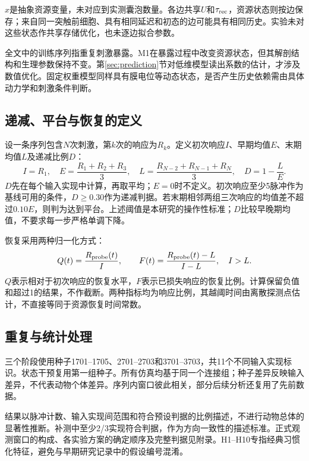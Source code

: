 $x$是抽象资源变量，未对应到实测囊泡数量。各边共享$U$和$\tau_{\rm rec}$，资源状态则按边保存；来自同一突触前细胞、具有相同延迟和初态的边可能具有相同历史。实验未对这些状态作共享存储优化，也未逐边拟合参数。

全文中的训练序列指重复刺激暴露。M1在暴露过程中改变资源状态，但其解剖结构和生理参数保持不变。第\ref{sec:prediction}节对低维模型读出系数的估计，才涉及数值优化。固定权重模型同样具有膜电位等动态状态，是否产生历史依赖需由具体动力学和刺激条件判断。

\subsection{递减、平台与恢复的定义}
设一条序列包含$N$次刺激，第$k$次的响应为$R_k$。定义初次响应$I$、早期均值$E$、末期均值$L$及递减比例$D$：
\begin{equation}
I=R_1,\quad E=\frac{R_1+R_2+R_3}{3},\quad L=\frac{R_{N-2}+R_{N-1}+R_N}{3},\quad D=1-\frac{L}{E}.
\label{eq:D}
\end{equation}
$D$先在每个输入实现中计算，再取平均；$E=0$时不定义。初次响应至少5脉冲作为基线可用的条件，$D\geq0.30$作为递减判据。若末期相邻两组三次响应的均值差不超过$0.10E$，则判为达到平台。上述阈值是本研究的操作性标准；$D$比较早晚期均值，不要求每一步严格单调下降。

恢复采用两种归一化方式：
\begin{equation}
Q(t)=\frac{R_{\rm probe}(t)}{I},\qquad F(t)=\frac{R_{\rm probe}(t)-L}{I-L},\quad I>L.
\label{eq:normalization}
\end{equation}
$Q$表示相对于初次响应的恢复水平，$F$表示已损失响应的恢复比例。计算保留负值和超过1的结果，不作截断。两种指标均为响应比例，其越阈时间由离散探测点估计，不直接等同于资源恢复时间常数。

\subsection{重复与统计处理}
三个阶段使用种子1701--1705、2701--2703和3701--3703，共11个不同输入实现标识。状态干预复用第一组种子。所有仿真均基于同一个连接组；种子差异反映输入差异，不代表动物个体差异。序列内窗口彼此相关，部分后续分析还复用了先前数据。

结果以脉冲计数、输入实现间范围和符合预设判据的比例描述，不进行动物总体的显著性推断。补测中至少2/3实现符合判据，作为方向一致性的描述标准。正式观测窗口的构成、各实验方案的确定顺序及完整判据见附录。H1--H10专指经典习惯化特征，避免与早期研究记录中的假设编号混淆。
\FloatBarrier
